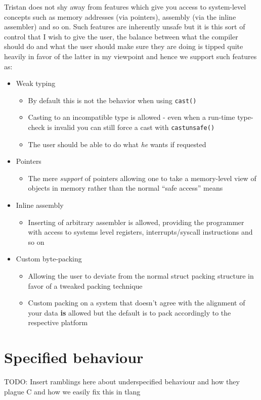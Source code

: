 Tristan does not shy away from features which give you access to system-level
concepts such as memory addresses (via pointers), assembly (via the
inline assembler) and so on. Such features are inherently unsafe but
it is this sort of control that I wish to give the user, the balance
between what the compiler should do and what the user should make
sure they are doing is tipped quite heavily in favor of the latter
in my viewpoint and hence we support such features as:
\begin{itemize}
\item Weak typing
\begin{itemize}
\item By default this is not the behavior when using \texttt{cast()}
\item Casting to an incompatible type is allowed - even when a run-time
type-check is invalid you can still force a cast with \texttt{castunsafe()}
\item The user should be able to do what \emph{he} wants if requested
\end{itemize}
\item Pointers
\begin{itemize}
\item The mere \emph{support} of pointers allowing one to take a memory-level
view of objects in memory rather than the normal ``safe access''
means
\end{itemize}
\item Inline assembly
\begin{itemize}
\item Inserting of arbitrary assembler is allowed, providing the programmer
with access to systems level registers, interrupts/syscall instructions
and so on
\end{itemize}
\item Custom byte-packing
\begin{itemize}
\item Allowing the user to deviate from the normal struct packing structure
in favor of a tweaked packing technique
\item Custom packing on a system that doesn't agree with the alignment of
your data \textbf{is }allowed but the default is to pack accordingly
to the respective platform
\end{itemize}
\end{itemize}

\section{Specified behaviour}

TODO: Insert ramblings here about underspecified behaviour and how
they plague C and how we easily fix this in tlang
